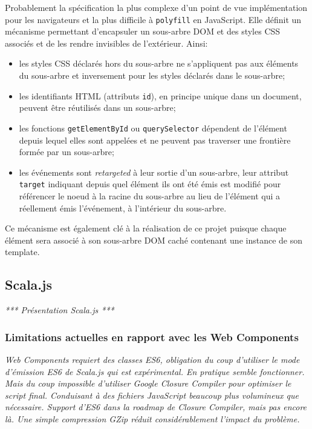 Probablement la spécification la plus complexe d'un point de vue implémentation pour les navigateurs et la plus difficile à \texttt{polyfill} en JavaScript. Elle définit un mécanisme permettant d'encapsuler un sous-arbre DOM et des styles CSS associés et de les rendre invisibles de l'extérieur. Ainsi:

\begin{itemize}
	\item les styles CSS déclarés hors du sous-arbre ne s'appliquent pas aux éléments du sous-arbre et inversement pour les styles déclarés dans le sous-arbre;
	
	\item les identifiants HTML (attributs \texttt{id}), en principe unique dans un document, peuvent être réutilisés dans un sous-arbre;
	
	\item les fonctions \texttt{getElementById} ou \texttt{querySelector} dépendent de l'élément depuis lequel elles sont appelées et ne peuvent pas traverser une frontière formée par un sous-arbre;
	
	\item les événements sont \emph{retargeted} à leur sortie d'un sous-arbre, leur attribut \texttt{target} indiquant depuis quel élément ils ont été émis est modifié pour référencer le noeud à la racine du sous-arbre au lieu de l'élément qui a réellement émis l'événement, à l'intérieur du sous-arbre.
\end{itemize}

Ce mécanisme est également clé à la réalisation de ce projet puisque chaque élément sera associé à son sous-arbre DOM caché contenant une instance de son template.

\subsection{Scala.js}

\textit{*** Présentation Scala.js ***}

\subsubsection{Limitations actuelles en rapport avec les Web Components}

\textit{Web Components requiert des classes ES6, obligation du coup d'utiliser le mode d'émission ES6 de Scala.js qui est expérimental. En pratique semble fonctionner. Mais du coup impossible d'utiliser Google Closure Compiler pour optimiser le script final. Conduisant à des fichiers JavaScript beaucoup plus volumineux que nécessaire. Support d'ES6 dans la roadmap de Closure Compiler, mais pas encore là. Une simple compression GZip réduit considérablement l'impact du problème.}